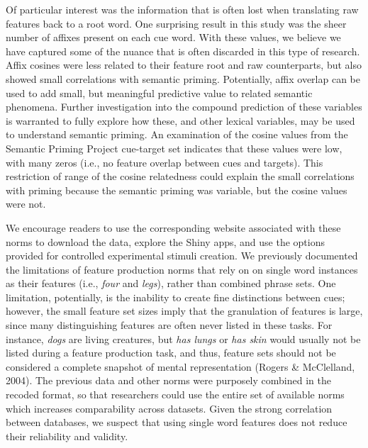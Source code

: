 \documentclass[english,,man]{apa6}
\theoremstyle{definition}
\theoremstyle{definition}
\theoremstyle{definition}
\theoremstyle{remark}
\begin{document}
Of particular interest was the information that is often lost when
translating raw features back to a root word. One surprising result in
this study was the sheer number of affixes present on each cue word.
With these values, we believe we have captured some of the nuance that
is often discarded in this type of research. Affix cosines were less
related to their feature root and raw counterparts, but also showed
small correlations with semantic priming. Potentially, affix overlap can
be used to add small, but meaningful predictive value to related
semantic phenomena. Further investigation into the compound prediction
of these variables is warranted to fully explore how these, and other
lexical variables, may be used to understand semantic priming. An
examination of the cosine values from the Semantic Priming Project
cue-target set indicates that these values were low, with many zeros
(i.e., no feature overlap between cues and targets). This restriction of
range of the cosine relatedness could explain the small correlations
with priming because the semantic priming was variable, but the cosine
values were not.

We encourage readers to use the corresponding website associated with
these norms to download the data, explore the Shiny apps, and use the
options provided for controlled experimental stimuli creation. We
previously documented the limitations of feature production norms that
rely on on single word instances as their features (i.e., \emph{four}
and \emph{legs}), rather than combined phrase sets. One limitation,
potentially, is the inability to create fine distinctions between cues;
however, the small feature set sizes imply that the granulation of
features is large, since many distinguishing features are often never
listed in these tasks. For instance, \emph{dogs} are living creatures,
but \emph{has lungs} or \emph{has skin} would usually not be listed
during a feature production task, and thus, feature sets should not be
considered a complete snapshot of mental representation (Rogers \&
McClelland, 2004). The previous data and other norms were purposely
combined in the recoded format, so that researchers could use the entire
set of available norms which increases comparability across datasets.
Given the strong correlation between databases, we suspect that using
single word features does not reduce their reliability and validity.
\end{document}
